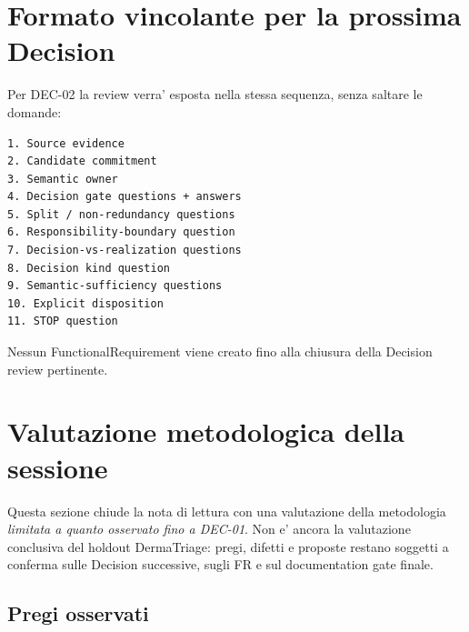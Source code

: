\documentclass[11pt,a4paper]{article}
\begin{document}
\section{Formato vincolante per la prossima Decision}

Per DEC-02 la review verra' esposta nella stessa sequenza, senza saltare le domande:

\begin{lstlisting}
1. Source evidence
2. Candidate commitment
3. Semantic owner
4. Decision gate questions + answers
5. Split / non-redundancy questions
6. Responsibility-boundary question
7. Decision-vs-realization questions
8. Decision kind question
9. Semantic-sufficiency questions
10. Explicit disposition
11. STOP question
\end{lstlisting}

Nessun FunctionalRequirement viene creato fino alla chiusura della Decision review pertinente.

\section{Valutazione metodologica della sessione}

Questa sezione chiude la nota di lettura con una valutazione della metodologia \emph{limitata a quanto osservato fino a DEC-01}. Non e' ancora la valutazione conclusiva del holdout DermaTriage: pregi, difetti e proposte restano soggetti a conferma sulle Decision successive, sugli FR e sul documentation gate finale.

\subsection{Pregi osservati}
\end{document}
